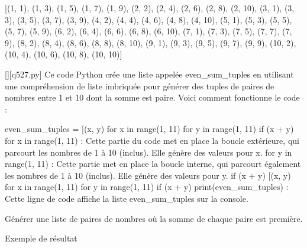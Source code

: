 [(1, 1), (1, 3), (1, 5), (1, 7), (1, 9), (2, 2), (2, 4), (2, 6), (2, 8), (2, 10), (3, 1), (3, 3), (3, 5), (3, 7), (3, 9), (4, 2), (4, 4), (4, 6), (4, 8), (4, 10), (5, 1), (5, 3), (5, 5), (5, 7), (5, 9), (6, 2), (6, 4), (6, 6), (6, 8), (6, 10), (7, 1), (7, 3), (7, 5), (7, 7), (7, 9), (8, 2), (8, 4), (8, 6), (8, 8), (8, 10), (9, 1), (9, 3), (9, 5), (9, 7), (9, 9), (10, 2), (10, 4), (10, 6), (10, 8), (10, 10)]
        \par
        \begin{solution}
            \renewcommand{\nomfichier}{q527.py}
            \pythonfile{\chemincode \nomfichier}[][\nomfichier]
            Ce code Python crée une liste appelée even_sum_tuples en utilisant une compréhension de liste imbriquée pour générer des tuples de paires de nombres entre 1 et 10 dont la somme est paire. Voici comment fonctionne le code :

    even_sum_tuples = [(x, y) for x in range(1, 11) for y in range(1, 11) if (x + y) %
        for x in range(1, 11) : Cette partie du code met en place la boucle extérieure, qui parcourt les nombres de 1 à 10 (inclus). Elle génère des valeurs pour x.
        for y in range(1, 11) : Cette partie met en place la boucle interne, qui parcourt également les nombres de 1 à 10 (inclus). Elle génère des valeurs pour y.
        if (x + y) %
        [(x, y) for x in range(1, 11) for y in range(1, 11) if (x + y) %
    print(even_sum_tuples) : Cette ligne de code affiche la liste even_sum_tuples sur la console.
        \end{solution}
        

        \question
        Générer une liste de paires de nombres où la somme de chaque paire est première.

Exemple de résultat

